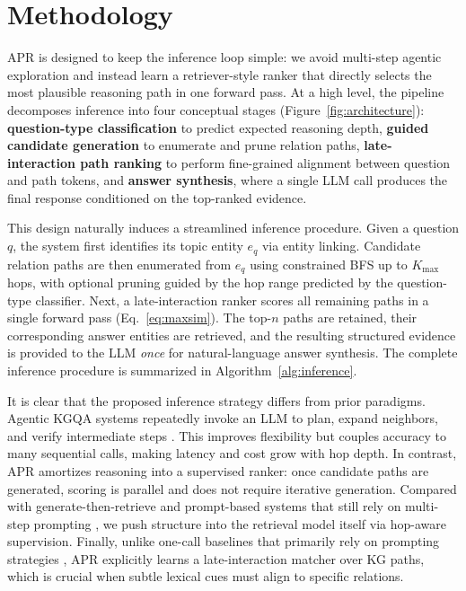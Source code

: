 \documentclass[conference]{IEEEtran}
\newcommand{\model}{\textsc{APR}}
\begin{document}
\section{Methodology}

\model{} is designed to keep the inference loop simple: we avoid multi-step agentic exploration and instead learn a retriever-style ranker that directly selects the most plausible reasoning path in one forward pass. At a high level, the pipeline decomposes inference into four conceptual stages (Figure~\ref{fig:architecture}): \textbf{question-type classification} to predict expected reasoning depth, \textbf{guided candidate generation} to enumerate and prune relation paths, \textbf{late-interaction path ranking} to perform fine-grained alignment between question and path tokens, and \textbf{answer synthesis}, where a single LLM call produces the final response conditioned on the top-ranked evidence.

This design naturally induces a streamlined inference procedure. Given a question $q$, the system first identifies its topic entity $e_q$ via entity linking. Candidate relation paths are then enumerated from $e_q$ using constrained BFS up to $K_{\text{max}}$ hops, with optional pruning guided by the hop range predicted by the question-type classifier. Next, a late-interaction ranker scores all remaining paths in a single forward pass (Eq.~\ref{eq:maxsim}). The top-$n$ paths are retained, their corresponding answer entities are retrieved, and the resulting structured evidence is provided to the LLM \emph{once} for natural-language answer synthesis. The complete inference procedure is summarized in Algorithm~\ref{alg:inference}.

It is clear that the proposed inference strategy differs from prior paradigms. Agentic KGQA systems repeatedly invoke an LLM to plan, expand neighbors, and verify intermediate steps \cite{sun2024tog, jiang2024kgagent, luo2024rog}. This improves flexibility but couples accuracy to many sequential calls, making latency and cost grow with hop depth. In contrast, \model{} amortizes reasoning into a supervised ranker: once candidate paths are generated, scoring is parallel and does not require iterative generation. Compared with generate-then-retrieve and prompt-based systems that still rely on multi-step prompting \cite{jiang2023structgpt, luo2024chatkbqa}, we push structure into the retrieval model itself via hop-aware supervision. Finally, unlike one-call baselines that primarily rely on prompting strategies \cite{zhang2024trustuqa, ao2025lightprof}, \model{} explicitly learns a late-interaction matcher over KG paths, which is crucial when subtle lexical cues must align to specific relations.
\end{document}
